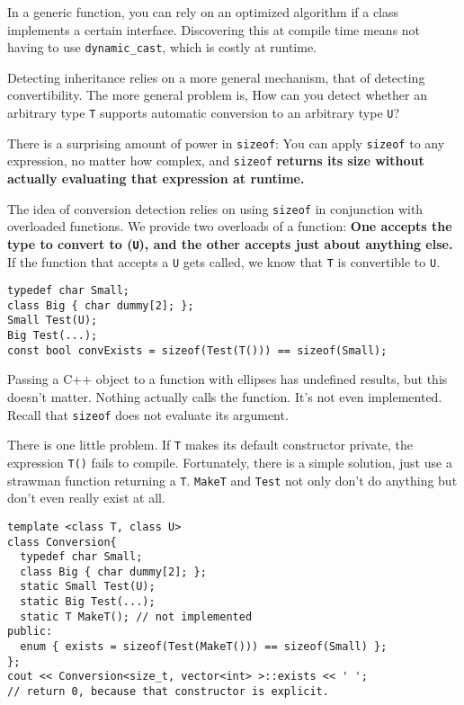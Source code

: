  In a generic function, you can rely on an optimized algorithm if a
 class implements a certain interface. Discovering this at compile
 time means not having to use \texttt{dynamic\_cast}, which is costly
 at runtime.

 Detecting inheritance relies on a more general mechanism, that of
 detecting convertibility. The more general problem is, How can you
 detect whether an arbitrary type \texttt{T} supports automatic
 conversion to an arbitrary type \texttt{U}?

 There is a surprising amount of power in \texttt{sizeof}: You can
 apply \texttt{sizeof} to any expression, no matter how complex, and
 \texttt{sizeof} \textbf{returns its size without actually evaluating
   that expression at runtime. }

 The idea of conversion detection relies on using \texttt{sizeof} in
 conjunction with overloaded functions. We provide two overloads of a
 function: \textbf{One accepts the type to convert to (\texttt{U}), and the
 other accepts just about anything else. } If the function that
accepts a \texttt{U} gets called, we know that \texttt{T} is
convertible to \texttt{U}.

\begin{verbatim}
typedef char Small;
class Big { char dummy[2]; };
Small Test(U);
Big Test(...);
const bool convExists = sizeof(Test(T())) == sizeof(Small);
\end{verbatim}
Passing a C++ object to a function with ellipses has undefined
results, but this doesn't matter. Nothing actually calls the
function. It's not even implemented. Recall that \texttt{sizeof} does
not evaluate its argument.

There is one little problem. If \texttt{T} makes its default constructor
private, the expression \texttt{T()} fails to compile. Fortunately,
there is a simple solution, just use a strawman function
returning a \texttt{T}.  \texttt{MakeT} and \texttt{Test} not only
don't do anything but don't even really exist at all.

\begin{verbatim}
template <class T, class U>
class Conversion{
  typedef char Small;
  class Big { char dummy[2]; };
  static Small Test(U);
  static Big Test(...);
  static T MakeT(); // not implemented
public:
  enum { exists = sizeof(Test(MakeT())) == sizeof(Small) };
};
cout << Conversion<size_t, vector<int> >::exists << ' ';
// return 0, because that constructor is explicit.
\end{verbatim}

